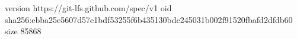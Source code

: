 version https://git-lfs.github.com/spec/v1
oid sha256:ebba25e5607d57e1bdf53255f6b435130bdc245031b002f91520fbafd2dfdb60
size 85868
